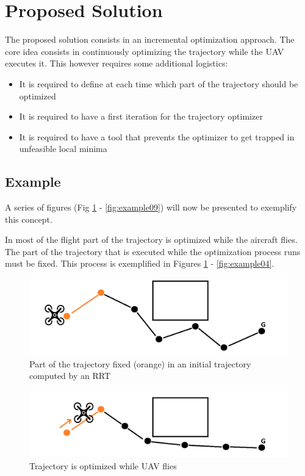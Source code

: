 \section{Proposed Solution}
 
The proposed solution consists in an incremental optimization approach. The core idea consists in continuously optimizing the trajectory while the UAV executes it. This however requires some additional logistics:
\begin{itemize}
    \item It is required to define at each time which part of the trajectory should be optimized
    \item It is required to have a first iteration for the trajectory optimizer
    \item It is required to have a tool that prevents the optimizer to get trapped in unfeasible local minima
\end{itemize}

\subsection{Example}

A series of figures (Fig \ref{fig:example02} - \ref{fig:example09}) will now be presented to exemplify this concept.
 \par
In most of the flight part of the trajectory is optimized while the aircraft flies.  The part of the trajectory that is executed while the optimization process runs must be fixed. This process is exemplified in Figures \ref{fig:example02} - \ref{fig:example04}.

\begin{figure}[ht!]
   \centering
   \includegraphics[width=0.6\linewidth]{Figures/03_proposed/EXAMPLE_02.png}
   \caption{Part  of  the  trajectory  fixed  (orange)  in  an  initial trajectory computed by an RRT}
   \label{fig:example02}
\end{figure}

\begin{figure}[ht!]
   \centering
   \includegraphics[width=0.6\linewidth]{Figures/03_proposed/EXAMPLE_03.png}
   \caption{Trajectory is optimized while UAV flies}
   \label{fig:example03}
\end{figure}

